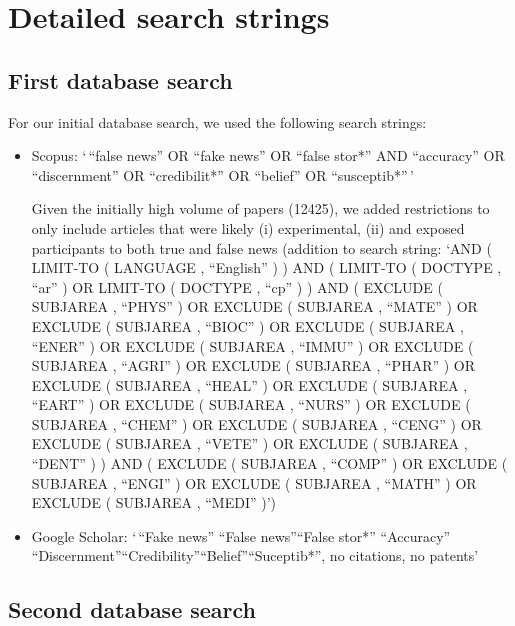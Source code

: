 \documentclass[
  man]{apa6}
\begin{document}
\clearpage

\section{Detailed search strings}\label{lit-review}

\FloatBarrier

\subsection{First database search}\label{first-database-search}

For our initial database search, we used the following search strings:

\begin{itemize}
\item
  Scopus:
  `\,``false news'' OR ``fake news'' OR ``false stor*'' AND ``accuracy'' OR ``discernment'' OR ``credibilit*'' OR ``belief'' OR ``susceptib*''\,'

  Given the initially high volume of papers (12425), we added restrictions to only include articles that were likely (i) experimental, (ii) and exposed participants to both true and false news (addition to search string: `AND ( LIMIT-TO ( LANGUAGE , ``English'' ) ) AND ( LIMIT-TO ( DOCTYPE , ``ar'' ) OR LIMIT-TO ( DOCTYPE , ``cp'' ) ) AND ( EXCLUDE ( SUBJAREA , ``PHYS'' ) OR EXCLUDE ( SUBJAREA , ``MATE'' ) OR EXCLUDE ( SUBJAREA , ``BIOC'' ) OR EXCLUDE ( SUBJAREA , ``ENER'' ) OR EXCLUDE ( SUBJAREA , ``IMMU'' ) OR EXCLUDE ( SUBJAREA , ``AGRI'' ) OR EXCLUDE ( SUBJAREA , ``PHAR'' ) OR EXCLUDE ( SUBJAREA , ``HEAL'' ) OR EXCLUDE ( SUBJAREA , ``EART'' ) OR EXCLUDE ( SUBJAREA , ``NURS'' ) OR EXCLUDE ( SUBJAREA , ``CHEM'' ) OR EXCLUDE ( SUBJAREA , ``CENG'' ) OR EXCLUDE ( SUBJAREA , ``VETE'' ) OR EXCLUDE ( SUBJAREA , ``DENT'' ) ) AND ( EXCLUDE ( SUBJAREA , ``COMP'' ) OR EXCLUDE ( SUBJAREA , ``ENGI'' ) OR EXCLUDE ( SUBJAREA , ``MATH'' ) OR EXCLUDE ( SUBJAREA , ``MEDI'' )')
\item
  Google Scholar: `\,``Fake news'' \textbar{} ``False news''\textbar{}``False stor*'' ``Accuracy'' \textbar{} ``Discernment''\textbar{}``Credibility''\textbar{}``Belief''\textbar{}``Suceptib*'', no citations, no patents'
\end{itemize}

\subsection{Second database search}\label{second-database-search}
\end{document}
